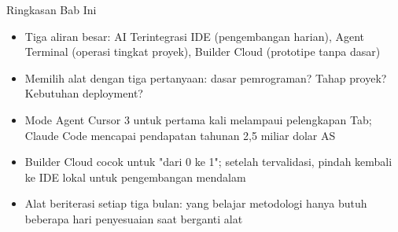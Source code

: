 \begin{tcbsummary}{Ringkasan Bab Ini}
\begin{itemize}
  \item Tiga aliran besar: AI Terintegrasi IDE (pengembangan harian), Agent Terminal (operasi tingkat proyek), Builder Cloud (prototipe tanpa dasar)
  \item Memilih alat dengan tiga pertanyaan: dasar pemrograman? Tahap proyek? Kebutuhan deployment?
  \item Mode Agent Cursor 3 untuk pertama kali melampaui pelengkapan Tab; Claude Code mencapai pendapatan tahunan 2,5 miliar dolar AS
  \item Builder Cloud cocok untuk "dari 0 ke 1"; setelah tervalidasi, pindah kembali ke IDE lokal untuk pengembangan mendalam
  \item Alat beriterasi setiap tiga bulan: yang belajar metodologi hanya butuh beberapa hari penyesuaian saat berganti alat
\end{itemize}

\end{tcbsummary}
